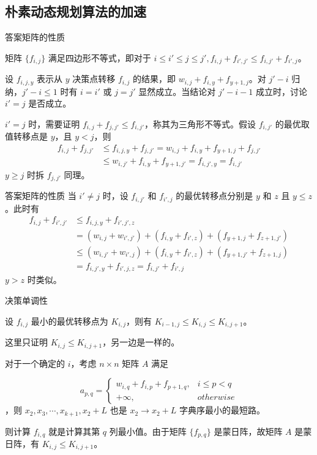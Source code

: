 \documentclass{beamer}
\begin{document}
\subsection{朴素动态规划算法的加速}
\begin{frame}{答案矩阵的性质}
	\begin{theorem}
		矩阵 $\{f_{i,j}\}$ 满足四边形不等式，即对于 $i \leq i' \le j \leq j',f_{i,j}+f_{i',j'} \leq f_{i,j'}+f_{i',j}$。
	\end{theorem}\pause
	设 $f_{i,j,y}$ 表示从 $y$ 决策点转移 $f_{i,j}$ 的结果，即 $w_{i,j}+f_{i,y}+f_{y+1,j}$。对 $j'-i$ 归纳，$j'-i \leq 1$ 时有 $i=i'$ 或 $j=j'$ 显然成立。当结论对 $j'-i-1$ 成立时，讨论 $i' = j$ 是否成立。
	
	$i '= j$ 时，需要证明 $f_{i,j}+f_{j,j'} \leq f_{i,j'}$，称其为三角形不等式。假设 $f_{i,j'}$ 的最优取值转移点是 $y$，且 $y < j$，则
	\begin{equation*}
	\begin{split}
	f_{i,j} + f_{j,j'} &\leq f_{i,j,y}+f_{j,j'}= w_{i,j} + f_{i,y}+f_{y+1,j}+f_{j,j'} \\ & \leq w_{i,j'}+f_{i,y}+f_{y+1,j'} = f_{i,j',y}=f_{i,j'}
	\end{split}
	\end{equation*}
	$y \geq j$ 时拆 $f_{j,j'}$ 同理。
\end{frame}
\begin{frame}{答案矩阵的性质}
	当 $i' \neq j$ 时，设 $f_{i,j'}$ 和 $f_{i',j}$ 的最优转移点分别是 $y$ 和 $z$ 且 $y \leq z$。此时有
	\begin{equation*}
	\begin{split}
	f_{i,j} + f_{i',j'} & \leq f_{i,j,y} + f_{i',j',z} \\ 
	&=(w_{i,j}+w_{i',j'})+(f_{i,y}+f_{i',z})+(f_{y+1,j}+f_{z+1,j'}) \\ 
	&\leq(w_{i,j'}+w_{i',j})+(f_{i,y}+f_{i',z})+(f_{y+1,j'}+f_{z+1,j}) \\ &= f_{i,j',y}+f_{i',j,z} = f_{i,j'}+f_{i',j}
	\end{split}
	\end{equation*}
	$y>z$ 时类似。
\end{frame}
\begin{frame}{决策单调性}
	\begin{theorem}
		设 $f_{i,j}$ 最小的最优转移点为 $K_{i,j}$，则有 $K_{i-1,j} \leq K_{i,j} \leq K_{i,j+1}$。
	\end{theorem}\pause
	这里只证明 $K_{i,j} \leq K_{i,j+1}$，另一边是一样的。
	
	对于一个确定的 $i$，考虑 $n \times n$ 矩阵 $A$ 满足
	
	$$a_{p,q}= \begin{cases}
	w_{i,q} + f_{i,p}+f_{p+1,q},& i \leq p < q \\
	+\infty, & otherwise
	\end{cases}$$，则 $x_2,x_3,\cdots,x_{k+1},x_2+L$ 也是 $x_2 \rightarrow x_2 + L$ 字典序最小的最短路。
	
	则计算 $f_{i,q}$ 就是计算其第 $q$ 列最小值。由于矩阵 $\{f_{p,q}\}$ 是蒙日阵，故矩阵 $A$ 是蒙日阵，有 $K_{i,j} \leq K_{i,j+1}$。
\end{frame}
\end{document}
